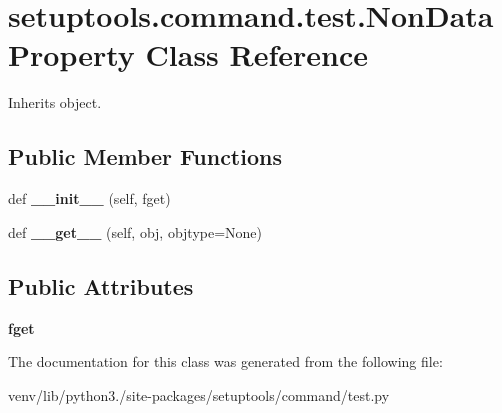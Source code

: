 \hypertarget{classsetuptools_1_1command_1_1test_1_1_non_data_property}{}\section{setuptools.\+command.\+test.\+Non\+Data\+Property Class Reference}
\label{classsetuptools_1_1command_1_1test_1_1_non_data_property}


Inherits object.

\subsection*{Public Member Functions}
\begin{DoxyCompactItemize}
\item 
\mbox{\label{classsetuptools_1_1command_1_1test_1_1_non_data_property_a9bb4953a9e935a826475a360115b88f6}} 
def {\bfseries \+\_\+\+\_\+init\+\_\+\+\_\+} (self, fget)
\item 
\mbox{\label{classsetuptools_1_1command_1_1test_1_1_non_data_property_a29f10b015e01c1fa37f1af0a0a50fc03}} 
def {\bfseries \+\_\+\+\_\+get\+\_\+\+\_\+} (self, obj, objtype=None)
\end{DoxyCompactItemize}
\subsection*{Public Attributes}
\begin{DoxyCompactItemize}
\item 
\mbox{\label{classsetuptools_1_1command_1_1test_1_1_non_data_property_ad59546ea0d8398ba23232ffb41515f66}} 
{\bfseries fget}
\end{DoxyCompactItemize}


The documentation for this class was generated from the following file\+:\begin{DoxyCompactItemize}
\item 
venv/lib/python3./site-\/packages/setuptools/command/test.\+py\end{DoxyCompactItemize}
